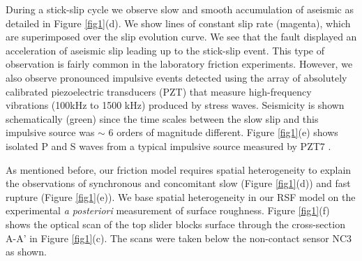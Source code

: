 \documentclass[final,3p, 11pt,authoryear]{elsarticle}
\begin{document}
During a stick-slip cycle we observe slow and smooth accumulation of aseismic as detailed in Figure \ref{fig1}(d). We show lines of constant slip rate (magenta), which are superimposed over the slip evolution curve.  We see that the fault displayed an acceleration of aseismic slip leading up to the stick-slip event. This type of observation is fairly common in the laboratory friction experiments. However, we also observe pronounced impulsive events detected using the array of absolutely calibrated piezoelectric transducers (PZT) that measure high-frequency vibrations (100kHz to 1500 kHz) produced by stress waves. Seismicity is shown schematically (green) since the time scales between the slow slip and this impulsive source was $\sim$ 6 orders of magnitude different.  Figure \ref{fig1}(e) shows isolated P and S waves from a typical impulsive source measured by PZT7  \citep{Selvadurai2019}.
 
As mentioned before, our friction model requires spatial heterogeneity to explain the observations of synchronous and concomitant slow (Figure \ref{fig1}(d)) and fast rupture (Figure \ref{fig1}(e)). We base spatial heterogeneity in our RSF model on the experimental \textit{a posteriori} measurement of surface roughness. Figure \ref{fig1}(f) shows the optical scan of the top slider blocks surface through the cross-section A-A' in Figure \ref{fig1}(c).  The scans were taken below the non-contact sensor NC3 as shown.
\end{document}
